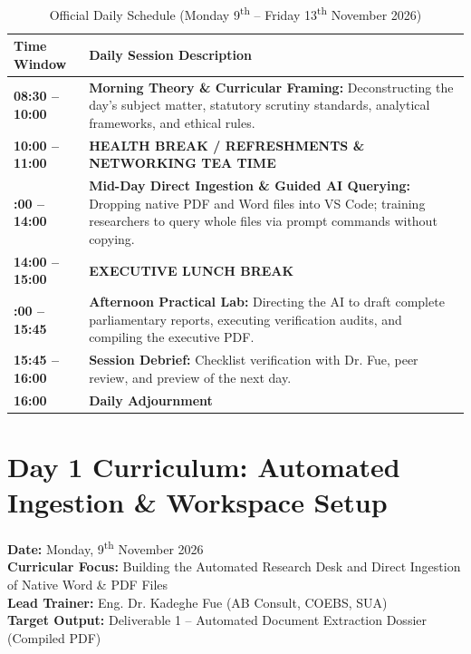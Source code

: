 \documentclass[11pt, a4paper]{report}
\begin{document}
\begin{table}[htbp]
\centering
\caption{Official Daily Schedule (Monday 9\textsuperscript{th} -- Friday 13\textsuperscript{th} November 2026)}
\label{tab:daily_schedule}
\vspace{0.2cm}
\begin{tabular}{@{}>{\bfseries}lp{11.5cm}@{}}
\toprule
Time Window & Daily Session Description \\
\midrule
08:30 -- 10:00 & \textbf{Morning Theory \& Curricular Framing:} Deconstructing the day's subject matter, statutory scrutiny standards, analytical frameworks, and ethical rules. \\
\addlinespace
\textbf{10:00 -- 11:00} & \textbf{HEALTH BREAK / REFRESHMENTS \& NETWORKING TEA TIME} \\
\addlinespace
11:00 -- 14:00 & \textbf{Mid-Day Direct Ingestion \& Guided AI Querying:} Dropping native PDF and Word files into VS Code; training researchers to query whole files via prompt commands without copying. \\
\addlinespace
\textbf{14:00 -- 15:00} & \textbf{EXECUTIVE LUNCH BREAK} \\
\addlinespace
15:00 -- 15:45 & \textbf{Afternoon Practical Lab:} Directing the AI to draft complete parliamentary reports, executing verification audits, and compiling the executive PDF. \\
15:45 -- 16:00 & \textbf{Session Debrief:} Checklist verification with Dr. Fue, peer review, and preview of the next day. \\
\textbf{16:00} & \textbf{Daily Adjournment} \\
\bottomrule
\end{tabular}
\end{table}

\newpage

\chapter{Day 1 Curriculum: Automated Ingestion \& Workspace Setup}
\textbf{Date:} Monday, 9\textsuperscript{th} November 2026\\
\textbf{Curricular Focus:} Building the Automated Research Desk and Direct Ingestion of Native Word \& PDF Files\\
\textbf{Lead Trainer:} Eng. Dr. Kadeghe Fue (AB Consult, COEBS, SUA)\\
\textbf{Target Output:} Deliverable 1 -- Automated Document Extraction Dossier (Compiled PDF)
\end{document}
